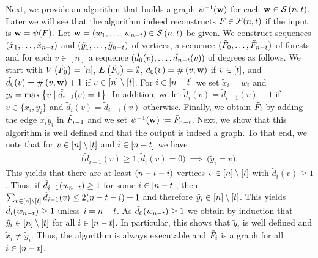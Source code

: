 Next, we provide an algorithm that builds a graph $\psi^{-1}(\mathbf{w})$ for each $\mathbf{w}\in \mathcal{S}\left(n, t\right)$. Later we will see that the algorithm indeed reconstructs $F\in\mathcal{F}(n,t)$ if the input is $\mathbf{w}=\psi(F)$. Let $\mathbf{w}=\left(w_1, \ldots, w_{n-t}\right)\in \mathcal{S}\left(n, t\right)$ be given. We construct sequences $(\tilde{x}_1, \ldots, \tilde{x}_{n-t})$ and $(\tilde{y}_1, \ldots, \tilde{y}_{n-t})$ of vertices, a sequence $\left(\tilde{F}_0, \ldots, \tilde{F}_{n-t}\right)$ of forests and for each $v\in[n]$ a sequence $(\tilde{d}_0(v), \ldots, \tilde{d}_{n-t}(v))$ of degrees as follows. We start with $V\left(\tilde{F}_0\right)=[n]$, $E\left(\tilde{F}_0\right)=\emptyset$, $\tilde{d}_0(v)=\#\left(v, \mathbf{w}\right)$ if $v\in [t]$, and $\tilde{d}_0(v)=\#\left(v, \mathbf{w}\right)+1$ if $v\in [n]\setminus[t]$. For $i\in[n-t]$ we set $\tilde{x}_i=w_i$ and $\tilde{y}_i=\max\left\{v \mid \tilde{d}_{i-1}(v)=1\right\}$. In addition, we let $\tilde{d}_i(v)=\tilde{d}_{i-1}(v)-1$ if $v\in\{\tilde{x}_i, \tilde{y}_i\}$ and $\tilde{d}_i(v)=\tilde{d}_{i-1}(v)$ otherwise. Finally, we obtain $\tilde{F}_i$ by adding the edge $\tilde{x}_i\tilde{y}_i$ in $\tilde{F}_{i-1}$ and we set $\psi^{-1}(\mathbf{w}):=\tilde{F}_{n-t}$. Next, we show that this algorithm is well defined and that the output is indeed a graph. To that end, we note that for $v\in[n]\setminus[t]$ and $i\in[n-t]$ we have
\begin{align*}
	\big(\tilde{d}_{i-1}(v)\geq 1, \tilde{d}_i(v)=0\big)~ \implies~ \big(\tilde{y}_i=v\big).
\end{align*}
This yields that there are at least $(n-t-i)$ vertices $v\in[n]\setminus[t]$ with $\tilde{d}_i(v)\geq 1$. Thus, if $\tilde{d}_{i-1}(w_{n-t})\geq 1$ for some $i\in[n-t]$, then $\sum_{v\in [n]\setminus [t]}\tilde{d}_{i-1}(v)\leq 2(n-t-i)+1$ and therefore $\tilde{y}_i\in[n]\setminus[t]$. This yields $\tilde{d}_{i}(w_{n-t})\geq 1$ unless $i=n-t$. As $\tilde{d}_{0}(w_{n-t})\geq 1$ we obtain by induction that $\tilde{y}_i\in[n]\setminus[t]$ for all $i\in[n-t]$. In particular, this shows that $\tilde{y}_i$ is well defined and $\tilde{x}_i\neq \tilde{y}_i$. Thus, the algorithm is always executable and $\tilde{F}_{i}$ is a graph for all $i\in[n-t]$.

